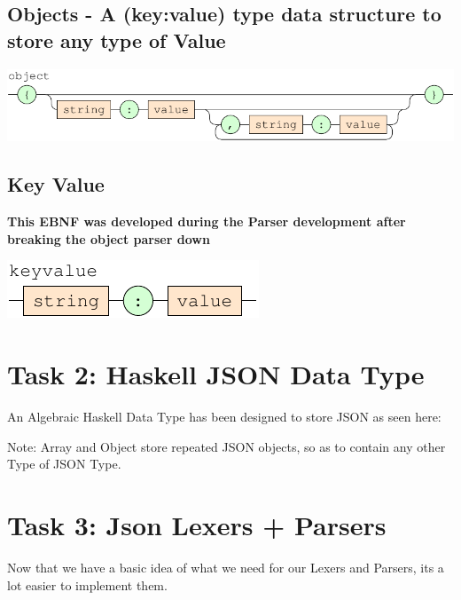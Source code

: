 \documentclass[a4paper]{article}
\begin{document}
\subsection*{Objects - A (key:value) type data structure to store any type of Value }

{\centering

   \includegraphics[scale=0.9]{EBNF/object}

}

\subsection*{Key Value}
\textbf{This EBNF was developed during the Parser development after breaking the object parser down}

{\centering

   \includegraphics[scale=0.9]{EBNF/keyvalue}

}

\newpage


\section{Task 2: Haskell JSON Data Type}

An Algebraic Haskell Data Type has been designed to store JSON as seen here:

Note: Array and Object store repeated JSON objects, so as to contain any other Type of JSON Type.


\newpage

\section{Task 3: Json Lexers + Parsers}

Now that we have a basic idea of what we need for our Lexers and Parsers, its a lot
easier to implement them.


\end{document}
